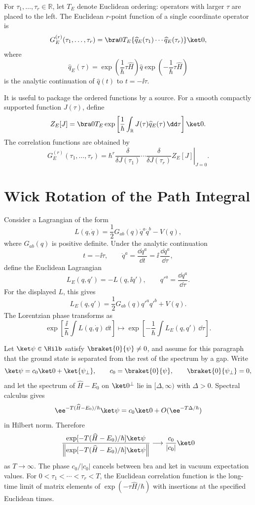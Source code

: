 For \(\tau_1,\ldots,\tau_r\in\mathbb R\), let \(T_E\) denote Euclidean
ordering: operators with larger \(\tau\) are placed to the left. The Euclidean
\(r\)-point function of a single coordinate operator is
\[
  G_E^{(r)}(\tau_1,\ldots,\tau_r)
  =
  \bra 0
  T_E\{\widehat q_E(\tau_1)\cdots\widehat q_E(\tau_r)\}
  \ket 0,
\]
where
\[
  \widehat q_E(\tau)
  =
  \exp\left(\frac{1}{\hbar}\tau\widehat H\right)
  \widehat q
  \exp\left(-\frac{1}{\hbar}\tau\widehat H\right)
\]
is the analytic continuation of \(\widehat q(t)\) to \(t=-\ii\tau\).

It is useful to package the ordered functions by a source. For a smooth
compactly supported function \(J(\tau)\), define
\[
  Z_E[J]
  =
  \bra 0
  T_E
  \exp\left[
    \frac{1}{\hbar}
    \int_{\mathbb R}J(\tau)\widehat q_E(\tau)\,\dd\tau
  \right]
  \ket 0 .
\]
The correlation functions are obtained by
\[
  G_E^{(r)}(\tau_1,\ldots,\tau_r)
  =
  \left.
  \hbar^r
  \frac{\delta}{\delta J(\tau_1)}
  \cdots
  \frac{\delta}{\delta J(\tau_r)}
  Z_E[J]
  \right|_{J=0}.
\]

\section{Wick Rotation of the Path Integral}

Consider a Lagrangian of the form
\[
  L(q,\dot q)
  =
  \frac12G_{ab}(q)\dot q^a\dot q^b-V(q),
\]
where \(G_{ab}(q)\) is positive definite. Under the analytic continuation
\[
  t=-\ii\tau,\qquad
  \dot q^a=\frac{\dd q^a}{\dd t}
  =
  \ii\,\frac{\dd q^a}{\dd\tau},
\]
define the Euclidean Lagrangian
\[
  L_E(q,q')
  =
  -L(q,\ii q'),
  \qquad q'^a=\frac{\dd q^a}{\dd\tau}.
\]
For the displayed \(L\), this gives
\[
  L_E(q,q')
  =
  \frac12G_{ab}(q)q'^aq'^b+V(q).
\]
The Lorentzian phase transforms as
\[
  \exp\left[
    \frac{\ii}{\hbar}\int L(q,\dot q)\,\dd t
  \right]
  \longmapsto
  \exp\left[
    -\frac{1}{\hbar}\int L_E(q,q')\,\dd\tau
  \right].
\]

Let \(\ket\psi\in\Hilb\) satisfy \(\braket{0}{\psi}\ne0\), and assume for this
paragraph that the ground state is separated from the rest of the spectrum by
a gap.  Write
\[
  \ket\psi=c_0\ket0+\ket{\psi_\perp},
  \qquad c_0=\braket{0}{\psi},
  \qquad \braket{0}{\psi_\perp}=0,
\]
and let the spectrum of \(\widehat H-E_0\) on \(\ket0^\perp\) lie in
\([\Delta,\infty)\) with \(\Delta>0\).  Spectral calculus gives
\[
  \ee^{-T(\widehat H-E_0)/\hbar}\ket\psi
  =
  c_0\ket0+O(\ee^{-T\Delta/\hbar})
\]
in Hilbert norm.  Therefore
\[
  \frac{\exp[-T(\widehat H-E_0)/\hbar]\ket\psi}
       {\left\|\exp[-T(\widehat H-E_0)/\hbar]\ket\psi\right\|}
  \longrightarrow
  \frac{c_0}{|c_0|}\ket0
\]
as \(T\to\infty\).  The phase \(c_0/|c_0|\) cancels between bra and ket in
vacuum expectation values.  For \(0<\tau_1<\cdots<\tau_r<T\), the
Euclidean correlation function is the long-time limit of matrix elements of
\(\exp(-\tau\widehat H/\hbar)\) with insertions at the specified Euclidean
times.

